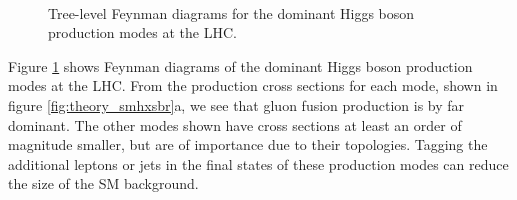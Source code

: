 \begin{figure}[h!]
\begin{center}
~\\
\end{center}
\caption[Tree-level Feynman diagrams for the dominant Higgs boson production modes at the LHC]{Tree-level Feynman diagrams for the dominant Higgs boson production modes at
the \ac{LHC}.}
\label{fig:theory_smhprod}
\end{figure}

Figure \ref{fig:theory_smhprod} shows Feynman diagrams of the dominant Higgs boson production modes
at the \ac{LHC}. From the production cross sections for each mode, shown in figure
\ref{fig:theory_smhxsbr}a, we see that gluon fusion production is by far dominant. The other modes
shown have cross sections at least an order of magnitude smaller, but are of importance due to their topologies.
Tagging the additional leptons or jets in the final states of
these production modes can reduce the size
of the \ac{SM} background.


